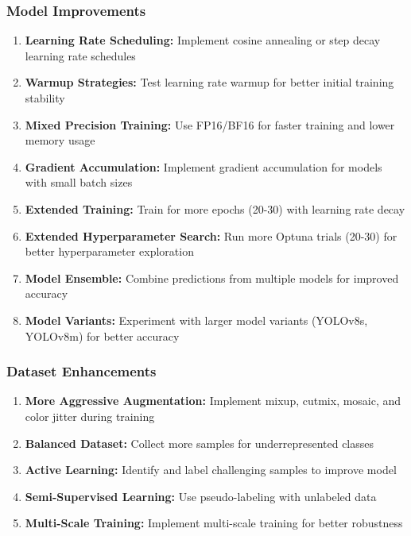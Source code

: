 \documentclass[12pt,a4paper]{article}
\begin{document}
\subsubsection{Model Improvements}

\begin{enumerate}
    \item \textbf{Learning Rate Scheduling:} Implement cosine annealing or step decay learning rate schedules
    \item \textbf{Warmup Strategies:} Test learning rate warmup for better initial training stability
    \item \textbf{Mixed Precision Training:} Use FP16/BF16 for faster training and lower memory usage
    \item \textbf{Gradient Accumulation:} Implement gradient accumulation for models with small batch sizes
    \item \textbf{Extended Training:} Train for more epochs (20-30) with learning rate decay
    \item \textbf{Extended Hyperparameter Search:} Run more Optuna trials (20-30) for better hyperparameter exploration
    \item \textbf{Model Ensemble:} Combine predictions from multiple models for improved accuracy
    \item \textbf{Model Variants:} Experiment with larger model variants (YOLOv8s, YOLOv8m) for better accuracy
\end{enumerate}

\subsubsection{Dataset Enhancements}

\begin{enumerate}
    \item \textbf{More Aggressive Augmentation:} Implement mixup, cutmix, mosaic, and color jitter during training
    \item \textbf{Balanced Dataset:} Collect more samples for underrepresented classes
    \item \textbf{Active Learning:} Identify and label challenging samples to improve model
    \item \textbf{Semi-Supervised Learning:} Use pseudo-labeling with unlabeled data
    \item \textbf{Multi-Scale Training:} Implement multi-scale training for better robustness
\end{enumerate}
\end{document}
